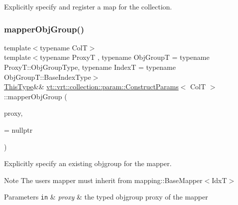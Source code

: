 Explicitly specify and register a map for the collection. 

\mbox{\label{structvt_1_1vrt_1_1collection_1_1param_1_1_construct_params_a041973f0795907cc88246a1409b30978}} 
\subsubsection{\texorpdfstring{mapper\+Obj\+Group()}{mapperObjGroup()}}
{\footnotesize\ttfamily template$<$typename ColT$>$ \\
template$<$typename ProxyT , typename Obj\+GroupT  = typename Proxy\+T\+::\+Obj\+Group\+Type, typename IndexT  = typename Obj\+Group\+T\+::\+Base\+Index\+Type$>$ \\
\hyperlink{structvt_1_1vrt_1_1collection_1_1param_1_1_construct_params_a13d4910c0f6825c7b0ddfebce5288bea}{This\+Type}\&\& \hyperlink{structvt_1_1vrt_1_1collection_1_1param_1_1_construct_params}{vt\+::vrt\+::collection\+::param\+::\+Construct\+Params}$<$ ColT $>$\+::mapper\+Obj\+Group (\begin{DoxyParamCaption}\item[{ProxyT}]{proxy,  }\item[{std\+::enable\+\_\+if\+\_\+t$<$ std\+::is\+\_\+convertible$<$ Obj\+GroupT $\ast$, \hyperlink{structvt_1_1mapping_1_1_base_mapper}{mapping\+::\+Base\+Mapper}$<$ IndexT $>$ $\ast$$>$\+::value $>$ $\ast$}]{ = {\ttfamily nullptr} }\end{DoxyParamCaption})\hspace{0.3cm}{\ttfamily [inline]}}



Explicitly specify an existing objgroup for the mapper. 

\begin{DoxyNote}{Note}
The user\textquotesingle{}s mapper must inherit from {\ttfamily mapping\+::\+Base\+Mapper$<$\+Idx\+T$>$} 
\end{DoxyNote}

\begin{DoxyParams}[1]{Parameters}
\mbox{\tt in}  & {\em proxy} & the typed objgroup proxy of the mapper \\
\hline
\end{DoxyParams}
\mbox{\label{structvt_1_1vrt_1_1collection_1_1param_1_1_construct_params_aee38f6542fd11f8b10f1eab73c590807}} 
